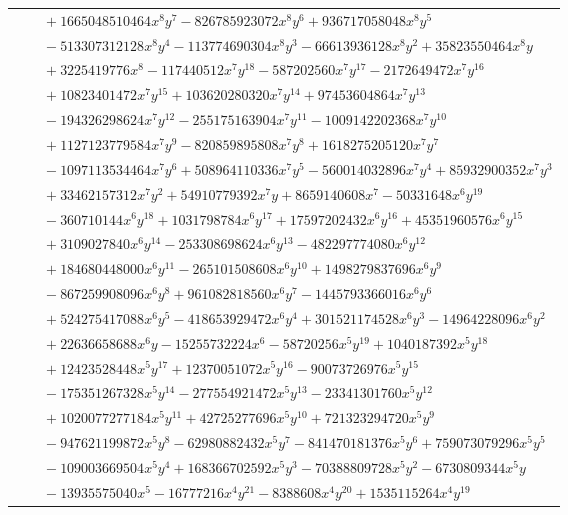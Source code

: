 \documentclass[11pt]{article}
\begin{document}
\begin{longtable}{@{}ll@{}}
 & $\quad +1665048510464x^{8}y^{7}-826785923072x^{8}y^{6}+936717058048x^{8}y^{5}$\\
 & $\quad -513307312128x^{8}y^{4}-113774690304x^{8}y^{3}-66613936128x^{8}y^{2}+35823550464x^{8}y$\\
 & $\quad +3225419776x^{8}-117440512x^{7}y^{18}-587202560x^{7}y^{17}-2172649472x^{7}y^{16}$\\
 & $\quad +10823401472x^{7}y^{15}+103620280320x^{7}y^{14}+97453604864x^{7}y^{13}$\\
 & $\quad -194326298624x^{7}y^{12}-255175163904x^{7}y^{11}-1009142202368x^{7}y^{10}$\\
 & $\quad +1127123779584x^{7}y^{9}-820859895808x^{7}y^{8}+1618275205120x^{7}y^{7}$\\
 & $\quad -1097113534464x^{7}y^{6}+508964110336x^{7}y^{5}-560014032896x^{7}y^{4}+85932900352x^{7}y^{3}$\\
 & $\quad +33462157312x^{7}y^{2}+54910779392x^{7}y+8659140608x^{7}-50331648x^{6}y^{19}$\\
 & $\quad -360710144x^{6}y^{18}+1031798784x^{6}y^{17}+17597202432x^{6}y^{16}+45351960576x^{6}y^{15}$\\
 & $\quad +3109027840x^{6}y^{14}-253308698624x^{6}y^{13}-482297774080x^{6}y^{12}$\\
 & $\quad +184680448000x^{6}y^{11}-265101508608x^{6}y^{10}+1498279837696x^{6}y^{9}$\\
 & $\quad -867259908096x^{6}y^{8}+961082818560x^{6}y^{7}-1445793366016x^{6}y^{6}$\\
 & $\quad +524275417088x^{6}y^{5}-418653929472x^{6}y^{4}+301521174528x^{6}y^{3}-14964228096x^{6}y^{2}$\\
 & $\quad +22636658688x^{6}y-15255732224x^{6}-58720256x^{5}y^{19}+1040187392x^{5}y^{18}$\\
 & $\quad +12423528448x^{5}y^{17}+12370051072x^{5}y^{16}-90073726976x^{5}y^{15}$\\
 & $\quad -175351267328x^{5}y^{14}-277554921472x^{5}y^{13}-23341301760x^{5}y^{12}$\\
 & $\quad +1020077277184x^{5}y^{11}+42725277696x^{5}y^{10}+721323294720x^{5}y^{9}$\\
 & $\quad -947621199872x^{5}y^{8}-62980882432x^{5}y^{7}-841470181376x^{5}y^{6}+759073079296x^{5}y^{5}$\\
 & $\quad -109003669504x^{5}y^{4}+168366702592x^{5}y^{3}-70388809728x^{5}y^{2}-6730809344x^{5}y$\\
 & $\quad -13935575040x^{5}-16777216x^{4}y^{21}-8388608x^{4}y^{20}+1535115264x^{4}y^{19}$\\

\end{longtable}
\end{document}
